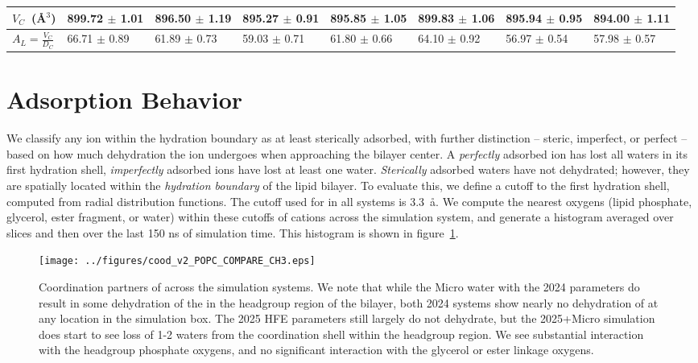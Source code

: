 \begin{table}[H]
{\begin{tabularx}{\textwidth}{X|X|X|X|X|X|X|X|}
    $V_C$~(\AA$^3$)                & 899.72 $\pm$ 1.01        & 896.50  $\pm$ 1.19               & 895.27 $\pm$ 0.91  & 895.85 $\pm$ 1.05  & 899.83 $\pm$ 1.06  & 895.94 $\pm$ 0.95  & 894.00 $\pm$ 1.11\\\hline
    $A_L=\frac{V_C}{D_C}$          & 66.71 $\pm$ 0.89         & 61.89 $\pm$ 0.73                 & 59.03 $\pm$ 0.71   & 61.80 $\pm$ 0.66   & 64.10 $\pm$ 0.92   & 56.97 $\pm$ 0.54   & 57.98 $\pm$ 0.57\\\hline
    \end{tabularx}
}
\end{table}
\section{\mg Adsorption Behavior}
We classify any ion within the hydration boundary as at least sterically adsorbed, with further distinction -- steric, imperfect, or perfect -- based on how much dehydration the ion undergoes when approaching the bilayer center. A \emph{perfectly} adsorbed ion has lost all waters in its first hydration shell, \emph{imperfectly} adsorbed ions
have lost at least one water. {\emph{Sterically} adsorbed} waters have not dehydrated; however, they are spatially located within the \emph{hydration boundary} of the lipid bilayer. To evaluate this, we define a cutoff to the first hydration shell,
computed from radial distribution functions. The cutoff used for \mg{} in all systems is 3.3~\aa. We compute the nearest oxygens (lipid phosphate, glycerol, ester fragment, or water) within these
cutoffs of cations across the simulation system, and generate a histogram averaged over slices and then over the last 150 ns of simulation time. This histogram is shown in
figure~\ref{fig:ioncoordination}.
\begin{figure}[H]
    \caption[Ion coordination summary]{Coordination partners of \mg{} across the simulation systems. We note that while the Micro water with the 2024 parameters do result in some dehydration
        of the \mg{} in the headgroup region of the bilayer, both 2024 systems show nearly no dehydration of \mg{} at any location in the simulation box. The 2025 HFE parameters
        still largely do not dehydrate, but the 2025+Micro simulation does start to see loss of 1-2 waters from the \mg{} coordination shell within the headgroup region.
    We see substantial interaction with the headgroup phosphate oxygens, and no significant interaction with the glycerol or ester linkage oxygens.}
\label{fig:ioncoordination}
\texttt{[image: ../figures/cood\_v2\_POPC\_COMPARE\_CH3.eps]}
\end{figure}
